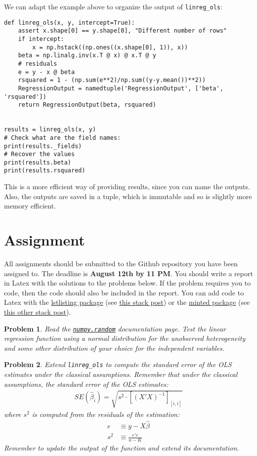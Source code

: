 \documentclass[12pt, a4paper]{article}
\newtheorem{problem}{Problem}
\begin{document}
We can adapt the example above to organize the output of \texttt{linreg\_ols}:
\lstset{language=jupyter-python,label= ,caption= ,captionpos=b,numbers=none}
\begin{lstlisting}
def linreg_ols(x, y, intercept=True):
    assert x.shape[0] == y.shape[0], "Different number of rows"
    if intercept:
        x = np.hstack((np.ones((x.shape[0], 1)), x))
    beta = np.linalg.inv(x.T @ x) @ x.T @ y
    # residuals
    e = y - x @ beta
    rsquared = 1 - (np.sum(e**2)/np.sum((y-y.mean())**2))
    RegressionOutput = namedtuple('RegressionOutput', ['beta', 'rsquared'])
    return RegressionOutput(beta, rsquared)


results = linreg_ols(x, y)
# Check what are the field names:
print(results._fields)
# Recover the values
print(results.beta)
print(results.rsquared)
\end{lstlisting}
This is a more efficient way of providing results, since you can name the outputs.
Also, the outputs are saved in a tuple, which is immutable and so is slightly more memory efficient.
\section{Assignment}
\label{sec:org71dc26a}
All assignments should be submitted to the Github repository you have been assigned to.
The deadline is \textbf{August 12th by 11 PM}.
You should write a report in Latex with the solutions to the problems below.
If the problem requires you to code, then the code should also be included in the report.
You can add code to Latex with the \href{http://texdoc.net/texmf-dist/doc/latex/listings/listings.pdf}{lstlisting package} (see \href{https://tex.stackexchange.com/a/83883/65818}{this stack post}) or the \href{http://tug.ctan.org/tex-archive/macros/latex/contrib/minted/minted.pdf}{minted package} (see \href{https://stackoverflow.com/a/1985330/1445572}{this other stack post}).

\begin{problem}
Read the \href{https://docs.scipy.org/doc/numpy/reference/routines.random.html}{\texttt{numpy.random}} documentation page.
Test the linear regression function using a normal distribution for the unobserved heterogeneity and some other distribution of your choice for the independent variables.
\end{problem}

\begin{problem}
Extend \texttt{linreg\_ols} to compute the standard error of the OLS estimates under the classical assumptions.
Remember that under the classical assumptions, the standard error of the OLS estimates:
\begin{align*}
SE(\hat{\beta}_i) = \sqrt{s^2\cdot[(X'X)^{-1}]_{[i, i]}}
\end{align*}
where \(s^2\) is computed from the residuals of the estimation:
\begin{align*}
e&\equiv y-X\hat{\beta}\\
s^2&\equiv\frac{e'e}{n-K}
\end{align*}
Remember to update the output of the function and extend its documentation.
\end{problem}
\end{document}
